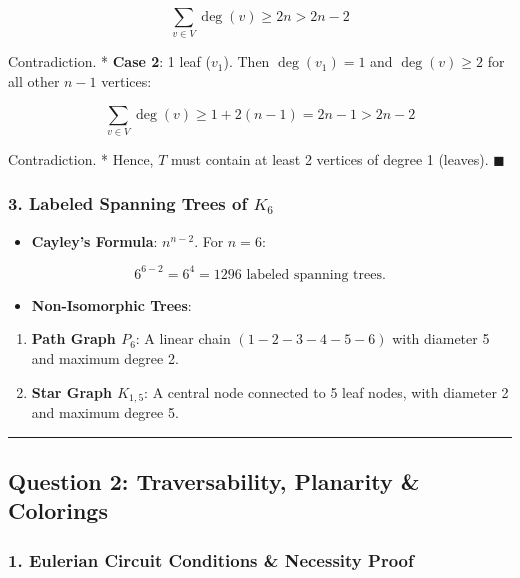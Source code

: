 \documentclass[
]{book}
\providecommand{\tightlist}{%
  \setlength{\itemsep}{0pt}\setlength{\parskip}{0pt}}
\theoremstyle{definition}
\theoremstyle{definition}
\theoremstyle{definition}
\theoremstyle{definition}
\theoremstyle{remark}
\begin{document}
\[\sum_{v \in V} \deg(v) \ge 2n > 2n - 2\]

Contradiction.
* \textbf{Case 2}: 1 leaf (\(v_1\)). Then \(\deg(v_1) = 1\) and \(\deg(v) \ge 2\) for all other \(n - 1\) vertices:

\[\sum_{v \in V} \deg(v) \ge 1 + 2(n - 1) = 2n - 1 > 2n - 2\]

Contradiction.
* Hence, \(T\) must contain at least 2 vertices of degree 1 (leaves). \(\blacksquare\)

\subsubsection{\texorpdfstring{3. Labeled Spanning Trees of \(K_6\)}{3. Labeled Spanning Trees of K\_6}}\label{labeled-spanning-trees-of-k_6}

\begin{itemize}
\tightlist
\item
  \textbf{Cayley's Formula}: \(n^{n-2}\). For \(n = 6\):
\end{itemize}

\[6^{6-2} = 6^4 = 1296 \text{ labeled spanning trees.}\]

\begin{itemize}
\tightlist
\item
  \textbf{Non-Isomorphic Trees}:
\end{itemize}

\begin{enumerate}
\def\labelenumi{\arabic{enumi}.}
\tightlist
\item
  \textbf{Path Graph \(P_6\)}: A linear chain \((1-2-3-4-5-6)\) with diameter 5 and maximum degree 2.
\item
  \textbf{Star Graph \(K_{1,5}\)}: A central node connected to 5 leaf nodes, with diameter 2 and maximum degree 5.
\end{enumerate}

\begin{center}\rule{0.5\linewidth}{0.5pt}\end{center}

\subsection{Question 2: Traversability, Planarity \& Colorings}\label{question-2-traversability-planarity-colorings}

\subsubsection{1. Eulerian Circuit Conditions \& Necessity Proof}\label{eulerian-circuit-conditions-necessity-proof}
\end{document}
